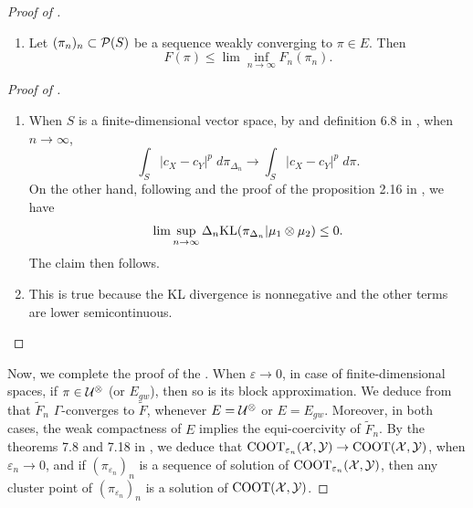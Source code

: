 \begin{proof}[Proof of ]
\begin{lemma}
\begin{enumerate}
        \item Let $(\pi_n)_n \subset \mathcal P(S)$ be a sequence weakly converging to $\pi \in E$. Then
        \begin{equation}
          F(\pi) \leq \lim \inf_{n \to \infty} F_{n}(\pi_n).
        \end{equation}
      \end{enumerate}
    \end{lemma}
    \begin{proof}[Proof of ]
      \text{ }
      \begin{enumerate}
        \item When $S$ is a finite-dimensional vector space, by  and
        definition 6.8 in \citep{Villani08}, when $n \to \infty$,
        \begin{equation}
          \int_S \vert c_X - c_Y\vert^p \; d\pi_{\Delta_n} \to \int_S \vert c_X - c_Y\vert^p \; d\pi.
        \end{equation}
        On the other hand, following  and the proof of the proposition 2.16 in \citep{Carlier17}, we have
        \begin{equation}
          \lim\sup_{n \to \infty} \Delta_n \text{KL}(\pi_{\Delta_n} \vert \mu_1 \otimes \mu_2) \leq 0.
        \end{equation}
        The claim then follows.

        \item This is true because the KL divergence is nonnegative and the other terms are lower semicontinuous.
      \end{enumerate}
    \end{proof}
    Now, we complete the proof of the .
    When $\varepsilon \to 0$, in case of finite-dimensional spaces, if $\pi \in \mathcal U^{\otimes}$ (or $E_{gw}$), then so is its block approximation.
    We deduce from  that $\widetilde{F}_{n}$ $\Gamma$-converges to
    $\widetilde{F}$, whenever $E = \mathcal U^{\otimes}$ or $E = E_{gw}$. Moreover, in both cases, the weak compactness of $E$ implies the equi-coercivity
    of $\widetilde{F}_n$. By the theorems 7.8 and 7.18 in \citep{Maso93}, we deduce that
    $\text{COOT}_{\varepsilon_n}(\mathcal X, \mathcal Y) \to \text{COOT}(\mathcal X, \mathcal Y)$, when $\varepsilon_n \to 0$,
    and if $(\pi_{\varepsilon_n})_{n}$ is a sequence of solution of $\text{COOT}_{\varepsilon_n}(\mathcal X, \mathcal Y)$,
    then any cluster point of $(\pi_{\varepsilon_n})_{n}$ is a solution of $\text{COOT}(\mathcal X, \mathcal Y)$.
  \end{proof}

